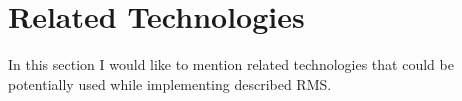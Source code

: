 
\chapter{Related Technologies}\label{ch:related-technologies}
In this section I would like to mention related technologies that could be potentially used while implementing described RMS\@.
